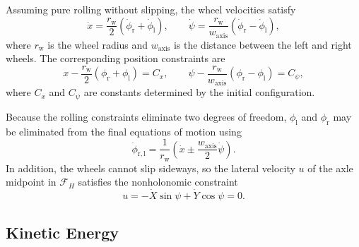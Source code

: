 \documentclass[journal]{IEEEtran}
\begin{document}
Assuming pure rolling without slipping, the wheel velocities satisfy
\begin{equation}
    \dot{x}
    =
    \frac{r_{\mathrm w}}{2}
    \left(\dot{\phi}_{\mathrm r}+\dot{\phi}_{\mathrm l}\right),
    \qquad
    \dot{\psi}
    =
    \frac{r_{\mathrm w}}{w_{\mathrm{axis}}}
    \left(\dot{\phi}_{\mathrm r}-\dot{\phi}_{\mathrm l}\right),
    \label{eq:rolling_constraint_velocity}
\end{equation}
where $r_{\mathrm w}$ is the wheel radius and $w_{\mathrm{axis}}$ is the
distance between the left and right wheels. The corresponding position
constraints are
\begin{equation}
    x-\frac{r_{\mathrm w}}{2}\left(\phi_{\mathrm r}+\phi_{\mathrm l}\right)=C_x,
    \qquad
    \psi-\frac{r_{\mathrm w}}{w_{\mathrm{axis}}}\left(\phi_{\mathrm r}-\phi_{\mathrm l}\right)=C_\psi,
    \label{eq:rolling_constraint_position}
\end{equation}
where $C_x$ and $C_\psi$ are constants determined by the initial
configuration.

Because the rolling constraints eliminate two degrees of freedom,
$\phi_{\mathrm l}$ and $\phi_{\mathrm r}$ may be eliminated from the final
equations of motion using
\begin{equation}
    \dot{\phi}_{\mathrm{r,l}}
    =
    \frac{1}{r_{\mathrm w}}
    \left(
        \dot{x}
        \pm
        \frac{w_{\mathrm{axis}}}{2}\dot{\psi}
    \right).
    \label{eq:rolling_constraint_acceleration}
\end{equation}
In addition, the wheels cannot slip sideways, so the lateral velocity $u$ of
the axle midpoint in $\mathcal{F}_H$ satisfies the nonholonomic constraint
\begin{equation}
    u = -\dot{X}\sin\psi + \dot{Y}\cos\psi = 0 .
    \label{eq:nonholonomic}
\end{equation}

\subsection{Kinetic Energy}
\end{document}
